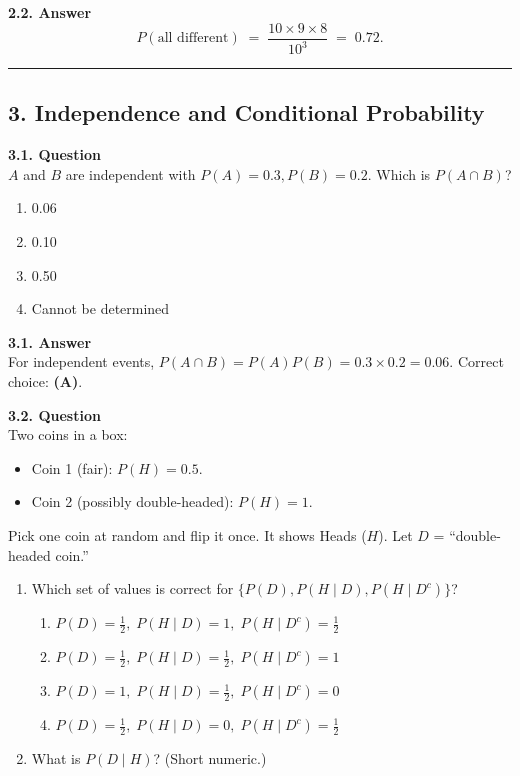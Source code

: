 \documentclass[12pt]{article}
\begin{document}
\noindent
\textbf{2.2. Answer}\\
\[
  P(\text{all different}) \;=\; \frac{10 \times 9 \times 8}{10^3} 
  \;=\; 0.72.
\]

\hrule

\subsection*{3. Independence and Conditional Probability}

\textbf{3.1. Question}\\
$A$ and $B$ are independent with $P(A)=0.3, P(B)=0.2.$ Which is $P(A\cap B)$?
\begin{enumerate}[label=\Alph*.]
\item 0.06
\item 0.10
\item 0.50
\item Cannot be determined
\end{enumerate}

\noindent
\textbf{3.1. Answer}\\
For independent events, $P(A\cap B)=P(A)P(B)=0.3\times0.2=0.06.$  
Correct choice: \textbf{(A)}.

\medskip

\textbf{3.2. Question}\\
Two coins in a box:
\begin{itemize}
\item Coin 1 (fair): $P(H)=0.5$.
\item Coin 2 (possibly double-headed): $P(H)=1$.
\end{itemize}
Pick one coin at random and flip it once. It shows Heads ($H$). Let $D$ = ``double-headed coin.''

\begin{enumerate}[label=(\alph*)]
\item Which set of values is correct for $\{P(D), P(H\mid D), P(H\mid D^c)\}$?
  \begin{enumerate}[label=\Alph*.]
  \item $P(D)=\tfrac12,\;P(H\mid D)=1,\;P(H\mid D^c)=\tfrac12$
  \item $P(D)=\tfrac12,\;P(H\mid D)=\tfrac12,\;P(H\mid D^c)=1$
  \item $P(D)=1,\;P(H\mid D)=\tfrac12,\;P(H\mid D^c)=0$
  \item $P(D)=\tfrac12,\;P(H\mid D)=0,\;P(H\mid D^c)=\tfrac12$
  \end{enumerate}

\item What is $P(D \mid H)$? (Short numeric.)
\end{enumerate}
\end{document}
